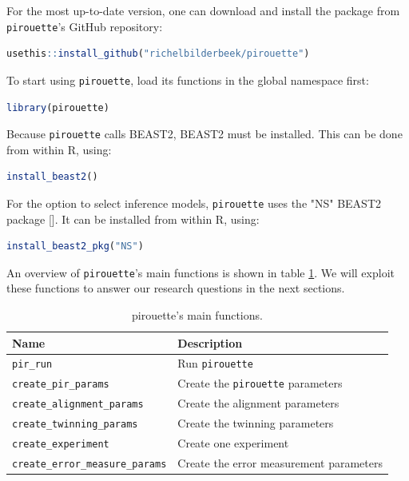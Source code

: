 \documentclass{article}
\begin{document}
For the most up-to-date version, 
one can download and install the package from \verb;pirouette;'s GitHub repository:

\begin{lstlisting}[language=R, floatplacement=ht, frame=single]
usethis::install_github("richelbilderbeek/pirouette")
\end{lstlisting}

To start using \verb;pirouette;, load its functions in the global namespace first:

\begin{lstlisting}[language=R, floatplacement=ht, frame=single]
library(pirouette)
\end{lstlisting}
Because \verb;pirouette; calls BEAST2, BEAST2 must be installed. 
This can be done from within R, using:

\begin{lstlisting}[language=R, floatplacement=ht, frame=single]
install_beast2()
\end{lstlisting}
For the option to select inference models,
\verb;pirouette; uses the "NS" BEAST2 package [\cite{maturana2018model}].
It can be installed from within R, using:

\begin{lstlisting}[language=R, floatplacement=ht, frame=single]
install_beast2_pkg("NS")
\end{lstlisting}

An overview of \verb;pirouette;'s main functions is shown in 
table \ref{tab:functions}. 
We will exploit these functions to answer our research questions in the next sections.

\begin{table}[h]
\centering
\begin{tabular}{ | l | l | }
\hline
\textbf{Name} & \textbf{Description} \\
\hline
\verb;pir_run; & Run \verb;pirouette; \\
\verb;create_pir_params; & Create the \verb;pirouette; parameters \\
\hline
\verb;create_alignment_params; & Create the alignment parameters \\
\verb;create_twinning_params; & Create the twinning parameters \\
\verb;create_experiment; & Create one experiment \\
\verb;create_error_measure_params; & Create the error measurement parameters \\
\hline
\end{tabular}
\caption{pirouette's main functions.}
\label{tab:functions}
\end{table}
\end{document}
